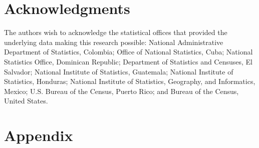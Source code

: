 \documentclass[
]{article}
\begin{document}
\newpage
\section*{Acknowledgments}

The authors wish to acknowledge the statistical offices that provided
the underlying data making this research possible: National
Administrative Department of Statistics, Colombia; Office of National
Statistics, Cuba; National Statistics Office, Dominican Republic;
Department of Statistics and Censuses, El Salvador; National Institute
of Statistics, Guatemala; National Institute of Statistics, Honduras;
National Institute of Statistics, Geography, and Informatics, Mexico;
U.S. Bureau of the Census, Puerto Rico; and Bureau of the Census, United
States.

\newpage
\section{Appendix}
\end{document}
